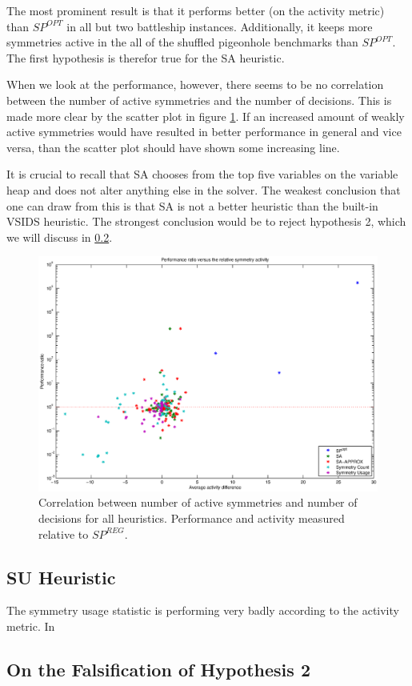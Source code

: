 	The most prominent result is that it performs better (on the activity metric) than $SP^{OPT}$ in
	all but two battleship instances.
	Additionally, it keeps more symmetries active in the all of the shuffled pigeonhole benchmarks
	than $SP^{OPT}$.
	The first hypothesis is therefor true for the SA heuristic.

	When we look at the performance, however, there seems to be no correlation
	between the number of active symmetries and the number of decisions.
	This is made more clear by the scatter plot in figure \ref{fig:correlation}.
	If an increased amount of weakly active symmetries would have resulted in better performance in
	general and vice versa, than the scatter plot should have shown some increasing line.

	It is crucial to recall that SA chooses from the top five variables on the variable heap and
	does not alter anything else in the solver.
	The weakest conclusion that one can draw from this is that SA is not a better heuristic than the
	built-in VSIDS heuristic.
	The strongest conclusion would be to reject hypothesis 2, which we will discuss in
	\ref{ssec:falsification_hyp_2}.

	\begin{figure}[!ht]
		\label{fig:correlation}
		\center
		\centerline{\includegraphics[width=1.2\textwidth]{results/scatterplot_activity.eps}}
		\caption{
			Correlation between number of active symmetries and number of decisions for all
			heuristics. Performance and activity measured relative to $SP^{REG}$.
		}
	\end{figure}

\subsection{SU Heuristic}
	The symmetry usage statistic is performing very badly according to the activity metric.
	In

\subsection{On the Falsification of Hypothesis 2}
\label{ssec:falsification_hyp_2}
